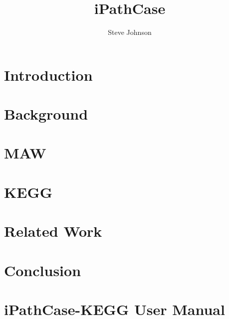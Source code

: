 \documentclass[12pt]{report}
\title{iPathCase}
\author{Steve Johnson}
\begin{document}

\newcommand{\mawapp}{ iPathCase-MAW }
\newcommand{\mawappp}{ iPathCase-MAW's }
\newcommand{\keggapp}{ iPathCase-KEGG }
\newcommand{\keggappp}{ iPathCase-KEGG's }



\setcounter{page}{1}


\setcounter{tocdepth}{1}
\tableofcontents

{}
\listoftables

{}
\listoffigures

\doublespace

\pagebreak

\setcounter{page}{1}


\pagebreak

\chapter{Introduction}
\label{ch:introduction}


\chapter{Background}
\label{ch:background}


\chapter{MAW}
\label{ch:maw_smda}


\chapter{KEGG}
\label{ch:kegg}


\chapter{Related Work}
\label{ch:related_work}


\chapter{Conclusion}
\label{ch:conclusion}


\appendix

\chapter{\keggapp User Manual}
\label{ch:kegg_manual}





\end{document}
